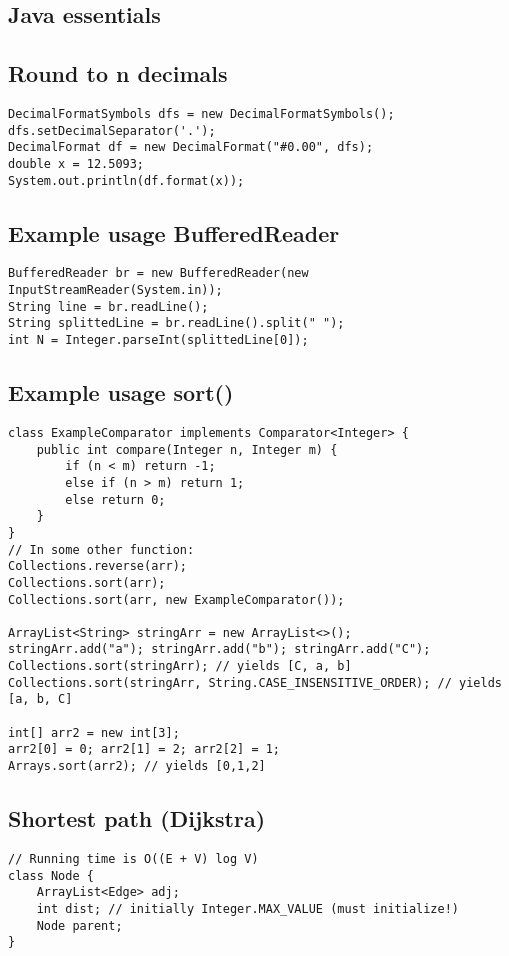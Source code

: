 \documentclass[8pt,a4paper,landscape,oneside]{amsart}
\begin{document}
\begin{multicols*}{3}
\section{Java essentials}
\subsection{Round to n decimals}
\begin{verbatim}
DecimalFormatSymbols dfs = new DecimalFormatSymbols();
dfs.setDecimalSeparator('.');
DecimalFormat df = new DecimalFormat("#0.00", dfs);
double x = 12.5093;
System.out.println(df.format(x));
\end{verbatim}

\subsection{Example usage BufferedReader}
\begin{verbatim}
BufferedReader br = new BufferedReader(new InputStreamReader(System.in));
String line = br.readLine();
String splittedLine = br.readLine().split(" ");
int N = Integer.parseInt(splittedLine[0]);
\end{verbatim}

\subsection{Example usage sort()}
\begin{verbatim}
class ExampleComparator implements Comparator<Integer> {
    public int compare(Integer n, Integer m) {
        if (n < m) return -1;
        else if (n > m) return 1;
        else return 0;
    }
}
// In some other function:
Collections.reverse(arr);
Collections.sort(arr);
Collections.sort(arr, new ExampleComparator());

ArrayList<String> stringArr = new ArrayList<>();
stringArr.add("a"); stringArr.add("b"); stringArr.add("C");
Collections.sort(stringArr); // yields [C, a, b]
Collections.sort(stringArr, String.CASE_INSENSITIVE_ORDER); // yields [a, b, C]

int[] arr2 = new int[3];
arr2[0] = 0; arr2[1] = 2; arr2[2] = 1;
Arrays.sort(arr2); // yields [0,1,2]
\end{verbatim}



\subsection{Shortest path (Dijkstra)}
\begin{verbatim}
// Running time is O((E + V) log V)
class Node {
    ArrayList<Edge> adj;
    int dist; // initially Integer.MAX_VALUE (must initialize!)
    Node parent;
}



\end{verbatim}
\end{multicols*}
\end{document}
